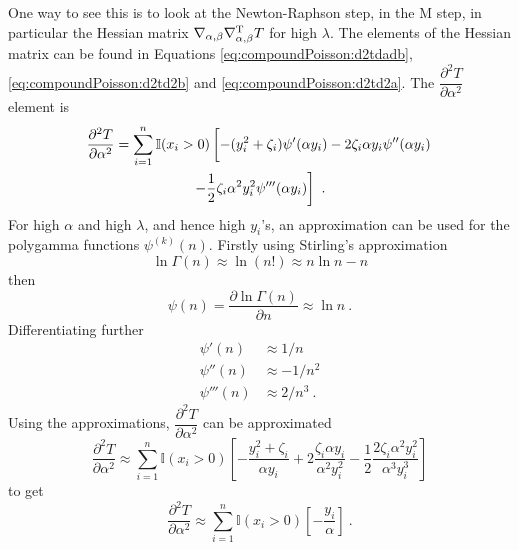 One way to see this is to look at the Newton-Raphson step, in the M step, in particular the Hessian matrix $\nabla_{\alpha,\beta}\nabla_{\alpha,\beta}^\textup{T} T$ for high $\lambda$. The elements of the Hessian matrix can be found in Equations \eqref{eq:compoundPoisson:d2tdadb}, \eqref{eq:compoundPoisson:d2td2b} and \eqref{eq:compoundPoisson:d2td2a}. The $\dfrac{\partial^2T}{\partial\alpha^2}$ element is 
\begin{multline*}
	\frac{\partial^2 T}{\partial \alpha^2} = 
	\sum_{i=1}^n\mathbb{I}(x_i>0)\left[
		-(y_i^2+\zeta_i)\psi'(\alpha y_i) - 2\zeta_i\alpha y_i\psi''(\alpha y_i)
		\vphantom{\frac{1}{2}}
	\right.
	\\
	\left.	
		-\frac{1}{2}\zeta_i\alpha^2y_i^2\psi'''(\alpha y_i)
	\right]
	\ .
\end{multline*}
For high $\alpha$ and high $\lambda$, and hence high $y_i$'s, an approximation can be used for the polygamma functions $\psi^{(k)}(n)$. Firstly using Stirling's approximation
\begin{equation}
	\ln\Gamma(n)\approx\ln(n!)\approx n\ln n-n
\end{equation}
then
\begin{equation}
	\psi(n) = \frac{\partial\ln\Gamma(n)}{\partial n} \approx \ln n
	\ .
\end{equation}
Differentiating further
\begin{align}
	\psi'(n) &\approx 1/n \\
	\psi''(n) & \approx -1/n^2 \\
	\psi'''(n) & \approx 2/n^3
	\ .
\end{align}
Using the approximations, $\dfrac{\partial^2T}{\partial\alpha^2}$ can be approximated
\begin{equation*}
	\frac{\partial^2 T}{\partial \alpha^2} \approx 
	\sum_{i=1}^n\mathbb{I}(x_i>0)
	\left[
		-\frac{y_i^2+\zeta_i}{\alpha y_i} + 2\frac{\zeta_i\alpha y_i}{\alpha^2 y_i^2}
		-\frac{1}{2}\frac{2\zeta_i\alpha^2y_i^2}{\alpha^3 y_i^3}
	\right]
\end{equation*}
to get
\begin{equation}
	\frac{\partial^2 T}{\partial \alpha^2} \approx 
	\sum_{i=1}^n\mathbb{I}(x_i>0)
	\left[
		-\frac{y_i}{\alpha}
	\right]
	\ .
\end{equation}

